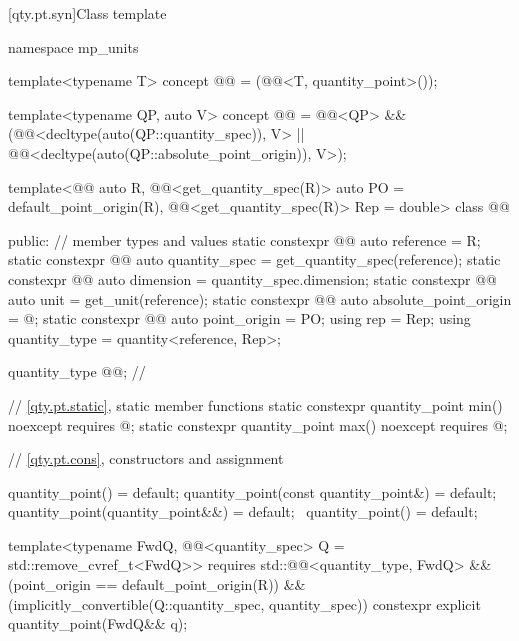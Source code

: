 [qty.pt.syn]{Class template }

\begin{codeblock}
namespace mp_units {

template<typename T>
concept @@ = (@@<T, quantity_point>());

template<typename QP, auto V>
concept @@ =
  @@<QP> && (@@<decltype(auto(QP::quantity_spec)), V> ||
                        @@<decltype(auto(QP::absolute_point_origin)), V>);

template<@@ auto R,
         @@<get_quantity_spec(R)> auto PO = default_point_origin(R),
         @@<get_quantity_spec(R)> Rep = double>
class @@ {
public:
  // member types and values
  static constexpr @@ auto reference = R;
  static constexpr @@ auto quantity_spec = get_quantity_spec(reference);
  static constexpr @@ auto dimension = quantity_spec.dimension;
  static constexpr @@ auto unit = get_unit(reference);
  static constexpr @@ auto absolute_point_origin = @\seebelownc@;
  static constexpr @@ auto point_origin = PO;
  using rep = Rep;
  using quantity_type = quantity<reference, Rep>;

  quantity_type @@;  // \expos

  // \ref{qty.pt.static}, static member functions
  static constexpr quantity_point min() noexcept
    requires @\seebelownc@;
  static constexpr quantity_point max() noexcept
    requires @\seebelownc@;

  // \ref{qty.pt.cons}, constructors and assignment

  quantity_point() = default;
  quantity_point(const quantity_point&) = default;
  quantity_point(quantity_point&&) = default;
  ~quantity_point() = default;

  template<typename FwdQ, @@<quantity_spec> Q = std::remove_cvref_t<FwdQ>>
    requires std::@@<quantity_type, FwdQ> &&
             (point_origin == default_point_origin(R)) &&
             (implicitly_convertible(Q::quantity_spec, quantity_spec))
  constexpr explicit quantity_point(FwdQ&& q);

}}
\end{codeblock}
